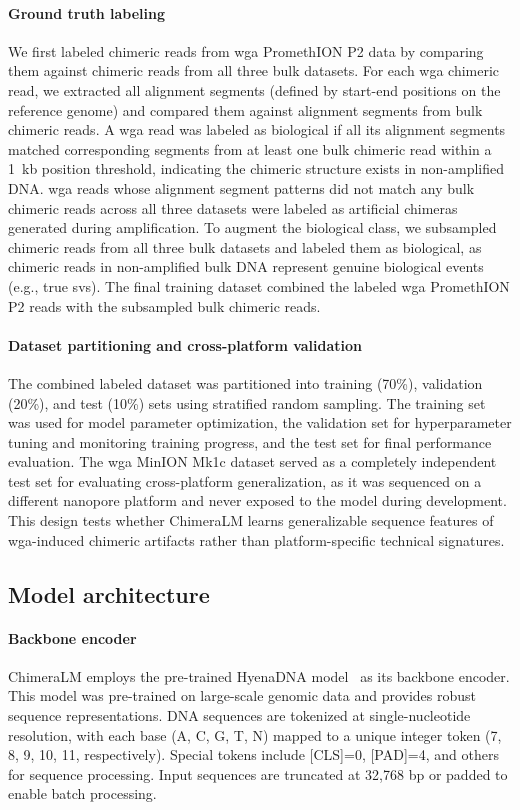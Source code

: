 \documentclass[pdflatex,sn-nature,lineno]{sn-jnl}%
\theoremstyle{thmstyleone}%
\theoremstyle{thmstyletwo}%
\theoremstyle{thmstylethree}%
\begin{document}
\paragraph{Ground truth labeling}
We first labeled chimeric reads from \gls{wga} PromethION P2 data by comparing them against chimeric reads from all three bulk datasets.
For each \gls{wga} chimeric read, we extracted all alignment segments (defined by start-end positions on the reference genome) and compared them against alignment segments from bulk chimeric reads.
A \gls{wga} read was labeled as biological if all its alignment segments matched corresponding segments from at least one bulk chimeric read within a 1~kb position threshold, indicating the chimeric structure exists in non-amplified DNA.
\gls{wga} reads whose alignment segment patterns did not match any bulk chimeric reads across all three datasets were labeled as artificial chimeras generated during amplification.
To augment the biological class, we subsampled chimeric reads from all three bulk datasets and labeled them as biological, as chimeric reads in non-amplified bulk DNA represent genuine biological events (e.g., true \glspl{sv}).
The final training dataset combined the labeled \gls{wga} PromethION P2 reads with the subsampled bulk chimeric reads.

\paragraph{Dataset partitioning and cross-platform validation}
The combined labeled dataset was partitioned into training (70\%), validation (20\%), and test (10\%) sets using stratified random sampling.
The training set was used for model parameter optimization, the validation set for hyperparameter tuning and monitoring training progress, and the test set for final performance evaluation.
The \gls{wga} MinION Mk1c dataset served as a completely independent test set for evaluating cross-platform generalization, as it was sequenced on a different nanopore platform and never exposed to the model during development.
This design tests whether ChimeraLM learns generalizable sequence features of \gls{wga}-induced chimeric artifacts rather than platform-specific technical signatures.

\subsection*{Model architecture}

\paragraph{Backbone encoder}
ChimeraLM employs the pre-trained HyenaDNA model~\cite{nguyen2023hyenadna} as its backbone encoder.
This model was pre-trained on large-scale genomic data and provides robust sequence representations.
DNA sequences are tokenized at single-nucleotide resolution, with each base (A, C, G, T, N) mapped to a unique integer token (7, 8, 9, 10, 11, respectively).
Special tokens include [CLS]=0, [PAD]=4, and others for sequence processing.
Input sequences are truncated at 32,768 bp or padded to enable batch processing.
\end{document}
